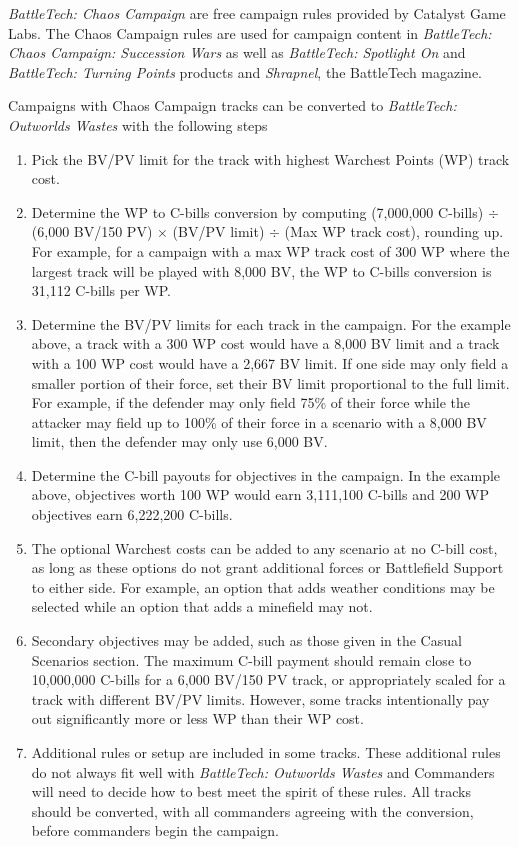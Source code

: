 \emph{BattleTech: Chaos Campaign} are free campaign rules provided by Catalyst Game Labs.
The Chaos Campaign rules are used for campaign content in \emph{BattleTech: Chaos Campaign: Succession Wars} as well as \emph{BattleTech: Spotlight On} and \emph{BattleTech: Turning Points} products and \emph{Shrapnel}, the BattleTech magazine.

Campaigns with Chaos Campaign tracks can be converted to \emph{BattleTech: Outworlds Wastes} with the following steps

\begin{enumerate}

\item Pick the BV/PV limit for the track with highest Warchest Points (WP) track cost.

\item Determine the WP to C-bills conversion by computing (7,000,000 C-bills) $\div$ (6,000 BV/150 PV) $\times$ (BV/PV limit) $\div$ (Max WP track cost), rounding up.
For example, for a campaign with a max WP track cost of 300 WP where the largest track will be played with 8,000 BV, the WP to C-bills conversion is 31,112 C-bills per WP.

\item Determine the BV/PV limits for each track in the campaign.
For the example above, a track with a 300 WP cost would have a 8,000 BV limit and a track with a 100 WP cost would have a 2,667 BV limit.
If one side may only field a smaller portion of their force, set their BV limit proportional to the full limit.
For example, if the defender may only field 75\% of their force while the attacker may field up to 100\% of their force in a scenario with a 8,000 BV limit, then the defender may only use 6,000 BV.

\item Determine the C-bill payouts for objectives in the campaign.
In the example above, objectives worth 100 WP would earn 3,111,100 C-bills and 200 WP objectives earn 6,222,200 C-bills.

\item The optional Warchest costs can be added to any scenario at no C-bill cost, as long as these options do not grant additional forces or Battlefield Support to either side.
For example, an option that adds weather conditions may be selected while an option that adds a minefield may not.

\item Secondary objectives may be added, such as those given in the Casual Scenarios section.
The maximum C-bill payment should remain close to 10,000,000 C-bills for a 6,000 BV/150 PV track, or appropriately scaled for a track with different BV/PV limits.
However, some tracks intentionally pay out significantly more or less WP than their WP cost.

\item Additional rules or setup are included in some tracks.
These additional rules do not always fit well with \emph{BattleTech: Outworlds Wastes} and Commanders will need to decide how to best meet the spirit of these rules.
All tracks should be converted, with all commanders agreeing with the conversion, before commanders begin the campaign.

\end{enumerate}
